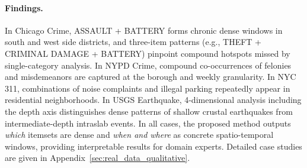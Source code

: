 \paragraph{Findings.}
In Chicago Crime, ASSAULT + BATTERY forms chronic dense windows
in south and west side districts,
and three-item patterns (e.g., THEFT + CRIMINAL DAMAGE + BATTERY)
pinpoint compound hotspots missed by single-category analysis.
In NYPD Crime, compound co-occurrences of felonies and misdemeanors
are captured at the borough and weekly granularity.
In NYC 311, combinations of noise complaints and illegal parking
repeatedly appear in residential neighborhoods.
In USGS Earthquake, 4-dimensional analysis including the depth axis
distinguishes dense patterns of shallow crustal earthquakes
from intermediate-depth intraslab events.
In all cases, the proposed method outputs
\emph{which} itemsets are dense and \emph{when and where}
as concrete spatio-temporal windows,
providing interpretable results for domain experts.
Detailed case studies are given in Appendix~\ref{sec:real_data_qualitative}.
